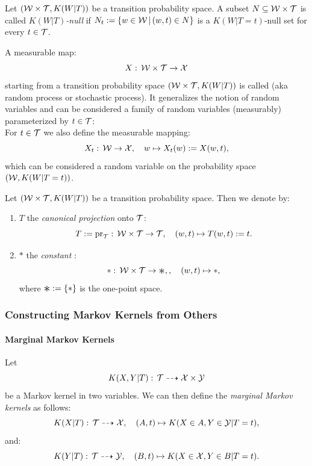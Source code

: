 \begin{Def}
Let $(\mathcal{W}\times \mathcal{T}, K(W|T))$ be a transition probability space.
A subset $N \subseteq \mathcal{W} \times \mathcal{T}$ is called \emph{$K(W|T)$-null} if 
$N_t:=\{ w \in \mathcal{W}\,|\, (w,t) \in N \}$ is a $K(W|T=t)$-null set for every $t \in \mathcal{T}$.
\end{Def}

\begin{Def}[\trv{}s]
    A measurable map:
    \[ X:\, \mathcal{W} \times \mathcal{T} \to \mathcal{X}  \]
    starting from a transition probability space $(\mathcal{W}\times \mathcal{T}, K(W|T))$ is called
    \emph{\trv{}} (aka random process or stochastic process).
    It generalizes the notion of random variables and can be considered a family of random variables (measurably) parameterized by $t \in \mathcal{T}$:\\
    For $t \in \mathcal{T}$ we also define the measurable mapping:
    \[ X_t:\, \mathcal{W} \to \mathcal{X},\quad w \mapsto X_t(w):= X(w,t),\]
    which can be considered a random variable on the probability space $(\mathcal{W},K(W|T=t))$.
\end{Def}


\begin{Eg}
        Let $(\mathcal{W}\times \mathcal{T}, K(W|T))$ be a transition probability space.
        Then we denote by:
        \begin{enumerate}
            \item $T$ the \emph{canonical projection} onto $\mathcal{T}$:
                \[T:= \mathrm{pr}_{\mathcal{T}}:\,\mathcal{W} \times \mathcal{T} \to \mathcal{T},\quad (w,t) \mapsto T(w,t):= t.\]
            \item $\ast$ the \emph{constant \trv{}}:
                \[ \ast :\,\Wcal \times \Tcal \to \Asterisk,,\quad (w,t) \mapsto \ast,\]
                where $\Asterisk:=\{\ast\}$ is the one-point space.
        \end{enumerate}
\end{Eg}


\subsubsection{Constructing Markov Kernels from Others}


\paragraph{Marginal Markov Kernels}

\begin{Def}
    \label{def-marginal-markov-kernels}
    Let 
    \[K(X,Y|T):\,\mathcal{T} \dashrightarrow  \mathcal{X} \times \mathcal{Y} \]
    be a Markov kernel in two variables.
    We can then define the \emph{marginal Markov kernels} as follows:
    \[ K(X|T):\, \mathcal{T} \dashrightarrow \mathcal{X},\quad (A,t) \mapsto K(X \in A, Y \in \mathcal{Y}|T=t),  \]
    and:
    \[ K(Y|T):\, \mathcal{T} \dashrightarrow \mathcal{Y},\quad (B,t) \mapsto K(X \in \mathcal{X}, Y \in B|T=t).  \]
\end{Def}

